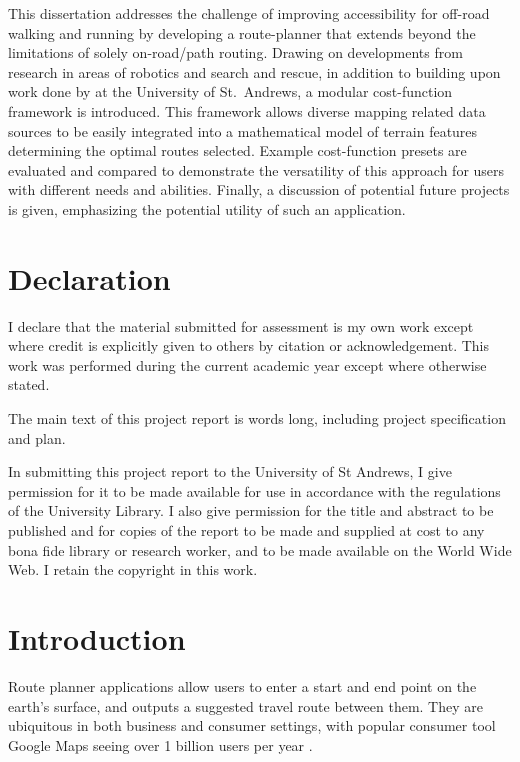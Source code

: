 \documentclass[12pt]{article}
\begin{document}
This dissertation addresses the challenge of improving accessibility for off-road walking and running by developing a route-planner that extends beyond the limitations of solely on-road/path routing. Drawing on developments from research in areas of robotics and search and rescue, in addition to building upon work done by \textcite{evans2023tsr} at the University of St.\ Andrews, a modular cost-function framework is introduced. This framework allows diverse mapping related data sources to be easily integrated into a mathematical model of terrain features determining the optimal routes selected. Example cost-function presets are evaluated and compared to demonstrate the versatility of this approach for users with different needs and abilities. Finally, a discussion of potential future projects is given, emphasizing the potential utility of such an application.

\section*{Declaration}

I declare that the material submitted for assessment is
my own work except where credit is explicitly given to
others by citation or acknowledgement. This work was
performed during the current academic year except where
otherwise stated.

The main text of this project report is
words long, including project specification and plan.

In submitting this project report to the University of St
Andrews, I give permission for it to be made available for
use in accordance with the regulations of the University
Library. I also give permission for the title and abstract to
be published and for copies of the report to be made and
supplied at cost to any bona fide library or research
worker, and to be made available on the World Wide Web.
I retain the copyright in this work.

\pagebreak
\tableofcontents

\pagebreak
\pagestyle{fancy}

\section{Introduction}

Route planner applications allow users to enter a start and end point on the earth's surface, and outputs a suggested travel route between them. They are ubiquitous in both business and consumer settings, with popular consumer tool Google Maps seeing over 1 billion users per year \autocite{google2019keyword}.
\end{document}
